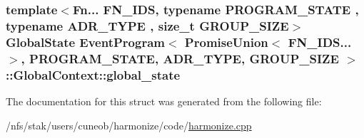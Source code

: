 \hypertarget{structEventProgram_3_01PromiseUnion_3_01FN__IDS_8_8_8_4_00	PROGRAM__STATE_00	ADR__TYPE_00	GROUP__SIZE_01_4_1_1GlobalContext_a8ee14278ed2847391a9aa0b395a279b2}{
\subsubsection[{global\-\_\-state}]{\setlength{\rightskip}{0pt plus 5cm}template$<$Fn... F\-N\-\_\-\-I\-D\-S, typename P\-R\-O\-G\-R\-A\-M\-\_\-\-S\-T\-A\-T\-E , typename A\-D\-R\-\_\-\-T\-Y\-P\-E , size\-\_\-t G\-R\-O\-U\-P\-\_\-\-S\-I\-Z\-E$>$ {\bf Global\-State} {\bf Event\-Program}$<$ {\bf Promise\-Union}$<$ F\-N\-\_\-\-I\-D\-S...$>$,	P\-R\-O\-G\-R\-A\-M\-\_\-\-S\-T\-A\-T\-E,	A\-D\-R\-\_\-\-T\-Y\-P\-E,	G\-R\-O\-U\-P\-\_\-\-S\-I\-Z\-E $>$\-::Global\-Context\-::global\-\_\-state}}\label{structEventProgram_3_01PromiseUnion_3_01FN__IDS_8_8_8_4_00	PROGRAM__STATE_00	ADR__TYPE_00	GROUP__SIZE_01_4_1_1GlobalContext_a8ee14278ed2847391a9aa0b395a279b2}


The documentation for this struct was generated from the following file\-:\begin{DoxyCompactItemize}
\item 
/nfs/stak/users/cuneob/harmonize/code/\hyperlink{harmonize_8cpp}{harmonize.\-cpp}\end{DoxyCompactItemize}
